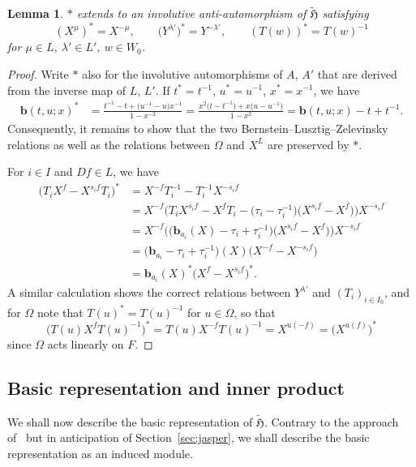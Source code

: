 \documentclass[pdftex]{sigma}
\newtheorem{Lemma}[Theorem]{Lemma}
\theoremstyle{definition}
\numberwithin{equation}{section}
\begin{document}
\begin{Lemma}\label{sec:lem-existence-involution}
 $*$ extends to an involutive anti-automorphism of $\tilde{\mathfrak{H}}$ satisfying
 \[
 (X^\mu)^* = X^{-\mu},\qquad
 \bigl(Y^{\lambda'}\bigr)^* = Y^{-\lambda'},\qquad
 (T(w))^* = T(w)^{-1}
 \]
 for $\mu\in L$, $\lambda'\in L'$, $w\in W_0$.
\end{Lemma}
\begin{proof}
 Write $*$ also for the involutive automorphisms of $A$, $A'$ that are derived from
 the inverse map of $L$, $L'$. If $t^*=t^{-1}$, $u^*=u^{-1}$, $x^*=x^{-1}$, we have
 \begin{align*}
 \bm{b}(t,u;x)^* &= \frac{t^{-1} - t + \bigl(u^{-1}-u\bigr)x^{-1}}{1-x^{-2}}
 = \frac{x^2\bigl(t-t^{-1}\bigr) + x\bigl(u-u^{-1}\bigr)}{1-x^2}= \bm{b}(t,u;x) - t + t^{-1}.
 \end{align*}
 Consequently, it remains to show that the two Bernstein--Lusztig--Zelevinsky relations as well
 as the relations between $\Omega$ and $X^L$ are preserved by $*$.

 For $i\in I$ and $Df\in L$, we have
 \begin{align*}
 \bigl(T_i X^f - X^{s_if}T_i\bigr)^*
 &= X^{-f} T_i^{-1} - T_i^{-1} X^{-s_if}\\
 &= X^{-f} \bigl(T_i X^{s_if} - X^f T_i - \bigl(\tau_i-\tau_i^{-1}\bigr)\bigl(X^{s_if}- X^f\bigr)\bigr) X^{-s_if}\\
 &= X^{-f} \bigl(\bigl(\bm{b}_{a_i}(X) - \tau_i + \tau_i^{-1}\bigr)\bigl(X^{s_if} - X^f\bigr)\bigr)
 X^{-s_if}\\
 &= \bigl(\bm{b}_{a_i} - \tau_i + \tau_i^{-1}\bigr)(X)\bigl(X^{-f} - X^{-s_if}\bigr)\\
 &= \bm{b}_{a_i}(X)^* \bigl(X^f - X^{s_i f}\bigr)^*.
 \end{align*}
 A similar calculation shows the correct relations between
 $Y^{\lambda'}$ and $(T_i)_{i\in I_0}$, and for $\Omega$ note that $T(u)^*=T(u)^{-1}$ for $u\in\Omega$, so that
 \[
 \bigl(T(u) X^f T(u)^{-1}\bigr)^*
 = T(u) X^{-f} T(u)^{-1}
 = X^{u(-f)}
 = \bigl(X^{u(f)}\bigr)^*
 \]
 since $\Omega$ acts linearly on $F$.
\end{proof}

\subsection{Basic representation and inner product}
We shall now describe the basic representation of $\tilde{\mathfrak{H}}$.
Contrary to the approach of~\cite{macdonald} but in anticipation of Section~\ref{sec:jasper}, we shall describe the basic representation as an induced module.
\end{document}
